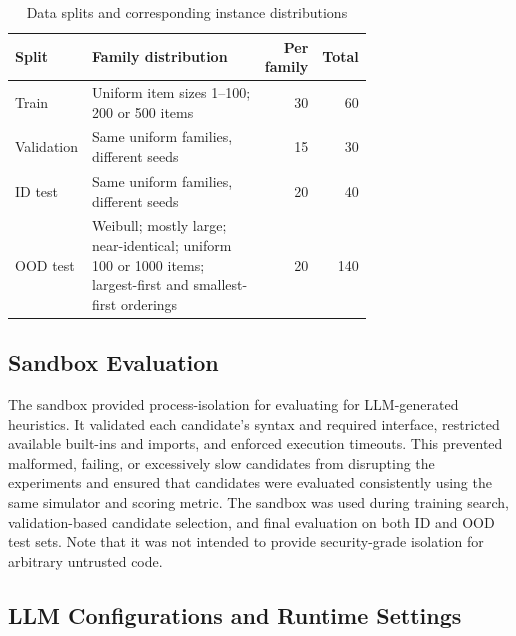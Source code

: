 \documentclass[12pt]{article}
\begin{document}
\begin{table}[htbp]\centering\small
\caption{Data splits and corresponding instance distributions}\label{tab:splits}
\begin{tabular}{p{0.19\linewidth}p{0.52\linewidth}rr}\hline
Split & Family distribution & Per family & Total \\\hline
Train & Uniform item sizes 1--100; 200 or 500 items & 30 & 60 \\
Validation & Same uniform families, different seeds & 15 & 30 \\
ID test & Same uniform families, different seeds & 20 & 40 \\
OOD test & Weibull; mostly large; near-identical; uniform 100 or 1000 items; largest-first and smallest-first orderings & 20 & 140 \\\hline
\end{tabular}\end{table}

\subsection{Sandbox Evaluation}
The sandbox provided process-isolation for evaluating for LLM-generated heuristics. It validated each candidate’s syntax and required  interface, restricted available built-ins and imports, and enforced execution timeouts. This prevented malformed, failing, or excessively slow candidates from disrupting the experiments and ensured that candidates were evaluated consistently using the same simulator and scoring metric. The sandbox was used during training search, validation-based candidate selection, and final evaluation on both ID and OOD test sets. Note that it was not intended to provide security-grade isolation for arbitrary untrusted code.

\subsection{LLM Configurations and Runtime Settings}
\end{document}
